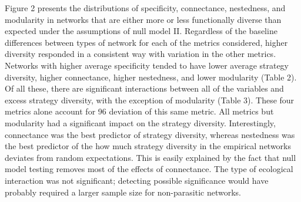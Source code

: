 Figure 2 presents the distributions of specificity, connectance, nestedness,
and modularity in networks that are either more or less functionally
diverse than expected under the assumptions of null model II. Regardless of
the baseline differences between types of network for each of the metrics
considered, higher diversity responded in a consistent way with variation in
the other metrics. Networks with higher average specificity tended to have
lower average strategy diversity, higher connectance, higher nestedness,
and lower modularity (Table 2). Of all these, there are significant
interactions between all of the variables and excess strategy diversity,
with the exception of modularity (Table 3). These four metrics alone account
for 96%
deviation of this same metric. All metrics but modularity had a significant
impact on the strategy diversity. Interestingly, connectance was the best
predictor of strategy diversity, whereas nestedness was the best predictor
of the how much strategy diversity in the empirical networks deviates from
random expectations. This is easily explained by the fact that null model
testing removes most of the effects of connectance. The type of ecological
interaction was not significant; detecting possible significance would have
probably required a larger sample size for non-parasitic networks.

